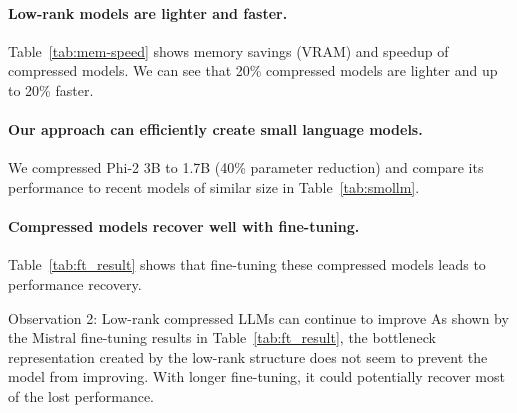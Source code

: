 \paragraph{Low-rank models are lighter and faster.}
Table~\ref{tab:mem-speed} shows memory savings (VRAM) and speedup of compressed models. We can see that 20\% compressed models are lighter and up to 20\% faster.

\paragraph{Our approach can efficiently create small language models.}
We compressed Phi-2 3B to 1.7B (40\% parameter reduction) and compare its performance to recent models of similar size in Table~\ref{tab:smollm}.

\paragraph{Compressed models recover well with fine-tuning.}
Table~\ref{tab:ft_result} shows that fine-tuning these compressed models leads to performance recovery.

\begin{insightbox}{Observation 2: Low-rank compressed LLMs can continue to improve}
As shown by the Mistral fine-tuning results in Table~\ref{tab:ft_result}, the bottleneck representation created by the low-rank structure does not seem to prevent the model from improving. With longer fine-tuning, it could potentially recover most of the lost performance.
\end{insightbox}

